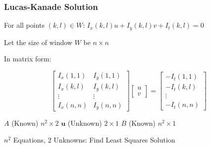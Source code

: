 \begin{frame}
  \frametitle{Lucas-Kanade Solution}

  For all points $(k,l) \in W$: \quad 
  $I_x(k,l)u + I_y(k,l)v + I_t(k,l) = 0$

  Let the size of window $W$ be $n \times n$

  In matrix form:

  \[
  \left[
  \begin{array}{cc}
  I_x(1,1) & I_y(1,1) \\
  I_x(k,l) & I_y(k,l) \\
  \vdots & \vdots \\
  I_x(n,n) & I_y(n,n)
  \end{array}
  \right]
  \left[
  \begin{array}{c}
  u \\
  v
  \end{array}
  \right]
  =
  \left[
  \begin{array}{c}
  -I_t(1,1) \\
  -I_t(k,l) \\
  \vdots \\
  -I_t(n,n)
  \end{array}
  \right]
  \]

  $A$ (Known) $n^2\times2$
  \hspace{0.5cm}
  $\mathbf{u}$ (Unknown) $2\times1$
  \hspace{0.5cm}
  $B$ (Known) $n^2\times1$

  \vspace{0.2cm}
  $n^2$ Equations, 2 Unknowns: Find Least Squares Solution

\end{frame}

